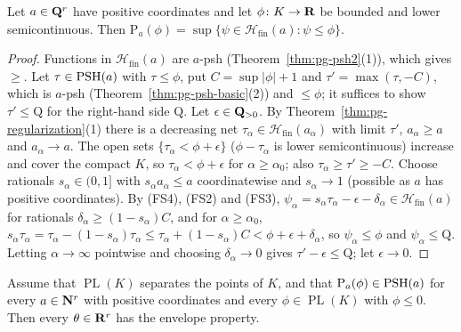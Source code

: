 \begin{lemma}\label{lem:sg-fs-envelope}
\leanok
{}
Let $a\in\mathbf{Q}^r$ have positive coordinates and let $\phi\colon K\to\mathbf{R}$ be bounded and lower semicontinuous. Then
$\mathrm P_a(\phi)=\sup\{\psi\in\mathcal H_{\mathrm{fin}}(a):\psi\le\phi\}$.
\end{lemma}

\begin{proof}
Functions in $\mathcal H_{\mathrm{fin}}(a)$ are $a$-psh (Theorem~\ref{thm:pg-psh2}(1)), which gives $\ge$. Let $\tau\in\operatorname{PSH}(a)$ with
$\tau\le\phi$, put $C=\sup|\phi|+1$ and $\tau'=\max(\tau,-C)$, which is $a$-psh (Theorem~\ref{thm:pg-psh-basic}(2)) and $\le\phi$;
it suffices to show $\tau'\le\mathrm Q$ for the right-hand side $\mathrm Q$. Let $\epsilon\in\mathbf{Q}_{>0}$. By
Theorem~\ref{thm:pg-regularization}(1) there is a decreasing net $\tau_\alpha\in\mathcal H_{\mathrm{fin}}(a_\alpha)$ with limit $\tau'$,
$a_\alpha\ge a$ and $a_\alpha\to a$. The open sets $\{\tau_\alpha<\phi+\epsilon\}$ ($\phi-\tau_\alpha$ is lower semicontinuous) increase
and cover the compact $K$, so $\tau_\alpha<\phi+\epsilon$ for $\alpha\ge\alpha_0$; also $\tau_\alpha\ge\tau'\ge-C$. Choose rationals
$s_\alpha\in(0,1]$ with $s_\alpha a_\alpha\le a$ coordinatewise and $s_\alpha\to1$ (possible as $a$ has positive coordinates). By (FS4),
(FS2) and (FS3), $\psi_\alpha=s_\alpha\tau_\alpha-\epsilon-\delta_\alpha\in\mathcal H_{\mathrm{fin}}(a)$ for rationals $\delta_\alpha\ge(1-s_\alpha)C$, and for
$\alpha\ge\alpha_0$, $s_\alpha\tau_\alpha=\tau_\alpha-(1-s_\alpha)\tau_\alpha\le\tau_\alpha+(1-s_\alpha)C<\phi+\epsilon+\delta_\alpha$, so $\psi_\alpha\le\phi$ and
$\psi_\alpha\le\mathrm Q$. Letting $\alpha\to\infty$ pointwise and choosing $\delta_\alpha\to0$ gives $\tau'-\epsilon\le\mathrm Q$; let
$\epsilon\to0$.
\end{proof}

\begin{theorem}\label{thm:sg-reduction}
\leanok
{}
Assume that $\operatorname{PL}(K)$ separates the points of $K$, and that $\mathrm P_a(\phi)\in\operatorname{PSH}(a)$ for every $a\in\mathbf{N}^r$ with
positive coordinates and every $\phi\in\operatorname{PL}(K)$ with $\phi\le0$. Then every $\theta\in\mathbf{R}^r$ has the envelope property.
\end{theorem}


